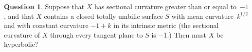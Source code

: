 \documentclass[JEP,XML,SOM,Unicode,NoEqCountersInSection,published]{cedram}
\theoremstyle{plain}
\theoremstyle{definition}
\newtheorem{question}[theorem]{Question}
\begin{document}
\begin{question}
Suppose that $X$ has sectional curvature greater than or equal to~$-1$, and that $X$ contains a closed totally umbilic surface $S$ with mean curvature~$k^{1/2}$ and with constant curvature $-1 +k$ in its intrinsic metric (\ie the sectional curvature of $X$ through every tangent plane to $S$ is $-1$.) Then must $X$ be hyperbolic?
\end{question}

\backmatter


\end{document}
